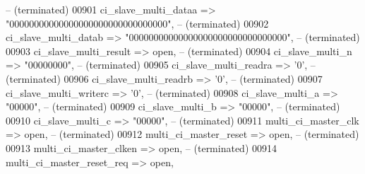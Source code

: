 \begin{DoxyCode}
{            --    (terminated)}
00901             ci\_slave\_multi\_dataa      => "\textcolor{vhdllogic}{00000000000000000000000000000000}",\textcolor{keyword}{                               
            --    (terminated)}
00902             ci\_slave\_multi\_datab      => "\textcolor{vhdllogic}{00000000000000000000000000000000}",\textcolor{keyword}{                               
            --    (terminated)}
00903             ci\_slave\_multi\_result     => \textcolor{keywordflow}{open},\textcolor{keyword}{                                                             
            --    (terminated)}
00904             ci\_slave\_multi\_n          => "\textcolor{vhdllogic}{00000000}",\textcolor{keyword}{                                                       
            --    (terminated)}
00905             ci\_slave\_multi\_readra     => '0',\textcolor{keyword}{                                                              
            --    (terminated)}
00906             ci\_slave\_multi\_readrb     => '0',\textcolor{keyword}{                                                              
            --    (terminated)}
00907             ci\_slave\_multi\_writerc    => '0',\textcolor{keyword}{                                                              
            --    (terminated)}
00908             ci\_slave\_multi\_a          => "\textcolor{vhdllogic}{00000}",\textcolor{keyword}{                                                          
            --    (terminated)}
00909             ci\_slave\_multi\_b          => "\textcolor{vhdllogic}{00000}",\textcolor{keyword}{                                                          
            --    (terminated)}
00910             ci\_slave\_multi\_c          => "\textcolor{vhdllogic}{00000}",\textcolor{keyword}{                                                          
            --    (terminated)}
00911             multi\_ci\_master\_clk       => \textcolor{keywordflow}{open},\textcolor{keyword}{                                                             
            --    (terminated)}
00912             multi\_ci\_master\_reset     => \textcolor{keywordflow}{open},\textcolor{keyword}{                                                             
            --    (terminated)}
00913             multi\_ci\_master\_clken     => \textcolor{keywordflow}{open},\textcolor{keyword}{                                                             
            --    (terminated)}
00914             multi\_ci\_master\_reset\_req => \textcolor{keywordflow}{open},\textcolor{keyword}{                                                             
}
\end{DoxyCode}
